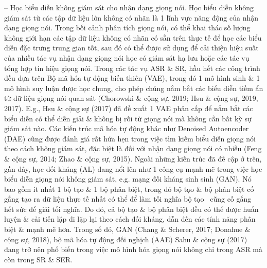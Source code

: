 \documentclass{article}
\begin{document}
\begin{itemize}
\begin{itemize}
\begin{itemize}
            -- Học biểu diễn không giám sát cho nhận dạng giọng nói. Học biểu diễn không giám sát từ các tập dữ liệu lớn không có nhãn là 1 lĩnh vực năng động của nhận dạng giọng nói. Trong bối cảnh phân tích giọng nói, có thể khai thác số lượng không giới hạn các tập dữ liệu không có nhãn có sẵn trên thực tế để học các biểu diễn đặc trưng trung gian tốt, sau đó có thể được sử dụng để cải thiện hiệu suất của nhiều tác vụ nhận dạng giọng nói học có giám sát hạ lưu hoặc các tác vụ tổng hợp tín hiệu giọng nói. Trong các tác vụ ASR \& SR, hầu hết các công trình đều dựa trên Bộ mã hóa tự động biến thiên (VAE), trong đó 1 mô hình sinh \& 1 mô hình suy luận được học chung, cho phép chúng nắm bắt các biểu diễn tiềm ẩn từ dữ liệu giọng nói quan sát (Chorowski \& cộng sự, 2019; Hsu \& cộng sự, 2019, 2017). E.g., Hsu \& cộng sự (2017) đã đề xuất 1 VAE phân cấp để nắm bắt các biểu diễn có thể diễn giải \& không bị rối từ giọng nói mà không cần bất kỳ sự giám sát nào. Các kiến trúc mã hóa tự động khác như Denoised Autoencoder (DAE) cũng được đánh giá rất hứa hẹn trong việc tìm kiếm biểu diễn giọng nói theo cách không giám sát, đặc biệt là đối với nhận dạng giọng nói có nhiễu (Feng \& cộng sự, 2014; Zhao \& cộng sự, 2015). Ngoài những kiến trúc đã đề cập ở trên, gần đây, học đối kháng (AL) đang nổi lên như 1 công cụ mạnh mẽ trong việc học biểu diễn giọng nói không giám sát, e.g. mạng đối kháng sinh sinh (GAN). Nó bao gồm ít nhất 1 bộ tạo \& 1 bộ phân biệt, trong đó bộ tạo \& bộ phân biệt cố gắng tạo ra dữ liệu thực tế nhất có thể để làm tối nghĩa bộ tạo \ cũng cố gắng hết sức để giải tối nghĩa. Do đó, cả bộ tạo \& bộ phân biệt đều có thể được huấn luyện \& cải tiến lặp đi lặp lại theo cách đối kháng, dẫn đến các tính năng phân biệt \& mạnh mẽ hơn. Trong số đó, GAN (Chang \& Scherer, 2017; Donahue \& cộng sự, 2018), bộ mã hóa tự động đối nghịch (AAE) Sahu \& cộng sự (2017) đang trở nên phổ biến trong việc mô hình hóa giọng nói không chỉ trong ASR mà còn trong SR \& SER.


\end{itemize}
\end{itemize}
\end{itemize}
\end{document}
